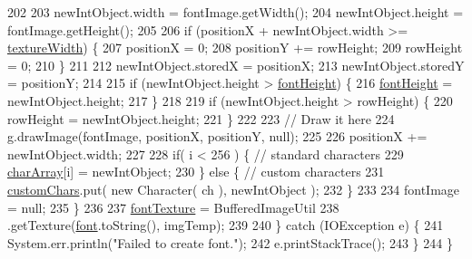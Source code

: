\begin{DoxyCode}
202 
203                 newIntObject.width = fontImage.getWidth();
204                 newIntObject.height = fontImage.getHeight();
205 
206                 \textcolor{keywordflow}{if} (positionX + newIntObject.width >= \mbox{\hyperlink{classorg_1_1newdawn_1_1slick_1_1_true_type_font_a9b5d5e4b07516d5c5f2918de908a6305}{textureWidth}}) \{
207                     positionX = 0;
208                     positionY += rowHeight;
209                     rowHeight = 0;
210                 \}
211 
212                 newIntObject.storedX = positionX;
213                 newIntObject.storedY = positionY;
214 
215                 \textcolor{keywordflow}{if} (newIntObject.height > \mbox{\hyperlink{classorg_1_1newdawn_1_1slick_1_1_true_type_font_a9bf36f9ee8aac6e87f0d1e2ba299cb3e}{fontHeight}}) \{
216                     \mbox{\hyperlink{classorg_1_1newdawn_1_1slick_1_1_true_type_font_a9bf36f9ee8aac6e87f0d1e2ba299cb3e}{fontHeight}} = newIntObject.height;
217                 \}
218 
219                 \textcolor{keywordflow}{if} (newIntObject.height > rowHeight) \{
220                     rowHeight = newIntObject.height;
221                 \}
222 
223                 \textcolor{comment}{// Draw it here}
224                 g.drawImage(fontImage, positionX, positionY, null);
225 
226                 positionX += newIntObject.width;
227 
228                 \textcolor{keywordflow}{if}( i < 256 ) \{ \textcolor{comment}{// standard characters}
229                     \mbox{\hyperlink{classorg_1_1newdawn_1_1slick_1_1_true_type_font_ae10a9ca17036288b7f76bd7ca10e4ea6}{charArray}}[i] = newIntObject;
230                 \} \textcolor{keywordflow}{else} \{ \textcolor{comment}{// custom characters}
231                     \mbox{\hyperlink{classorg_1_1newdawn_1_1slick_1_1_true_type_font_a9043b8f092d2d1b8c7d65a4518fc4d3f}{customChars}}.put( \textcolor{keyword}{new} Character( ch ), newIntObject );
232                 \}
233 
234                 fontImage = null;
235             \}
236 
237             \mbox{\hyperlink{classorg_1_1newdawn_1_1slick_1_1_true_type_font_ace4f234c78e28498a78c1879c943704a}{fontTexture}} = BufferedImageUtil
238                     .getTexture(\mbox{\hyperlink{classorg_1_1newdawn_1_1slick_1_1_true_type_font_a7c0b002b6010aa855bf4391ecf749498}{font}}.toString(), imgTemp);
239 
240         \} \textcolor{keywordflow}{catch} (IOException e) \{
241             System.err.println(\textcolor{stringliteral}{"Failed to create font."});
242             e.printStackTrace();
243         \}
244     \}
\end{DoxyCode}
\mbox{\label{classorg_1_1newdawn_1_1slick_1_1_true_type_font_a0086e7a568d5ecd92f718bb2c31890f5}} 
